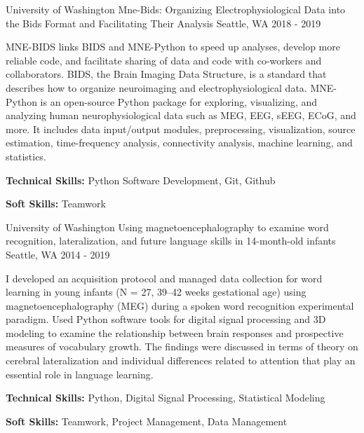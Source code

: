 \begin{cventries}
  \cventry
    {University of Washington} %
    {Mne-Bids: Organizing Electrophysiological Data into the Bids Format and Facilitating Their Analysis} %
    {Seattle, WA} %
    {2018 - 2019} %
    {
      \begin{cvitems} %
        \item {MNE-BIDS links BIDS and MNE-Python to speed up analyses, develop more reliable code, and facilitate sharing of data and code with co-workers and collaborators. BIDS, the Brain Imaging Data Structure, is a standard that describes how to organize neuroimaging and electrophysiological data. MNE-Python is an open-source Python package for exploring, visualizing, and analyzing human neurophysiological data such as MEG, EEG, sEEG, ECoG, and more. It includes data input/output modules, preprocessing, visualization, source estimation, time-frequency analysis, connectivity analysis, machine learning, and statistics.}
        \item {\textbf{Technical Skills:} Python Software Development, Git, Github}
        \item {\textbf{Soft Skills:} Teamwork}
      \end{cvitems}
    }

  \cventry
    {University of Washington} %
    {Using magnetoencephalography to examine word recognition, lateralization, and future language skills in 14-month-old infants} %
    {Seattle, WA} %
    {2014 - 2019} %
    {
      \begin{cvitems} %
        \item {I developed an acquisition protocol and managed data collection for word learning in young infants (N = 27, 39–42 weeks gestational age) using magnetoencephalography (MEG) during a spoken word recognition experimental paradigm. Used Python software tools for digital signal processing and 3D modeling to examine the relationship between brain responses and prospective measures of vocabulary growth. The findings were discussed in terms of theory on cerebral lateralization and individual differences related to attention that play an essential role in language learning.}
        \item {\textbf{Technical Skills:} Python, Digital Signal Processing, Statistical Modeling}
        \item {\textbf{Soft Skills:} Teamwork, Project Management, Data Management}
      \end{cvitems}
    }


\end{cventries}
